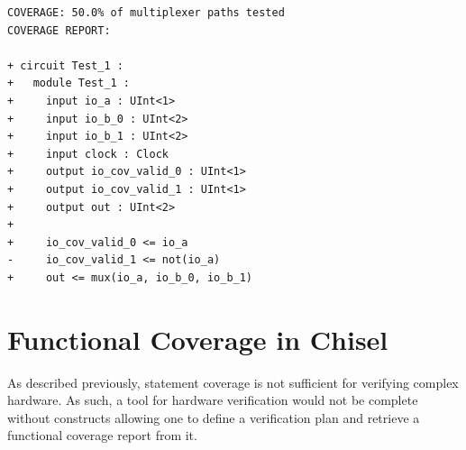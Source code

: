 \documentclass[conference]{IEEEtran}
\newcommand{\martin}[1]{{\color{blue} Martin: #1}}
\begin{document}
\begin{verbatim}
COVERAGE: 50.0% of multiplexer paths tested
COVERAGE REPORT:

+ circuit Test_1 :
+   module Test_1 :
+     input io_a : UInt<1>
+     input io_b_0 : UInt<2>
+     input io_b_1 : UInt<2>
+     input clock : Clock
+     output io_cov_valid_0 : UInt<1>
+     output io_cov_valid_1 : UInt<1>
+     output out : UInt<2>
+   
+     io_cov_valid_0 <= io_a
-     io_cov_valid_1 <= not(io_a)
+     out <= mux(io_a, io_b_0, io_b_1)
\end{verbatim}



\section{Functional Coverage in Chisel}
As described previously, statement coverage is not sufficient for verifying complex hardware. As such, a tool for hardware verification would not be complete without constructs allowing one to define a verification plan and retrieve a functional coverage report from it. %
\end{document}
